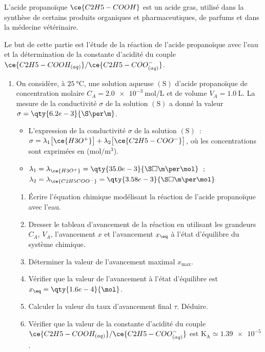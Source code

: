 L'acide propanoïque $\ce{C2H5-COOH}$ est un acide gras, utilisé dans la synthèse
de certains produits organiques et pharmaceutiques, de parfums et dans la
médecine vétérinaire.

Le but de cette partie est l'étude de la réaction de l'acide propanoïque avec
l'eau et la détermination de la constante d'acidité du couple
$\ce{C2H5-COOH_{(aq)}}/\ce{C2H5-COO^{-}_{(aq)}}$.

\begin{enumerate}
    \item On considère, à $\qty{25}{\degreeCelsius}$, une solution aqueuse
          $(\mathrm{S})$ d'acide propanoïque de concentration molaire
          $C_{A}=\qty{2.0e-3}{\mol\per\L}$ et de volume $V_{A}=\qty{1.0}{\L}$.
          La mesure de la conductivité $\sigma$ de la solution $(\mathrm{S})$ a
          donné la valeur $\sigma=\qty{6.2e-3}{\S\per\m}$.

          \begin{donnees}
              \begin{itemize}
                  \item L'expression de la conductivité $\sigma$ de la solution
                        $(\mathrm{S})$~:
                        $\sigma=\lambda_{1}\bigl[\ce{H3O^{+}}\bigr]+
                        \lambda_{2}\bigl[\ce{C2H5-COO^{-}}\bigr]$, où
                        les concentrations sont exprimées en
                        ($\unit{\mol\per\cubic\m}$).
                  \item $\lambda_{1}=\lambda_{\ce{H3O^{+}}}=
                        \qty{35.0e-3}{\S\square\m\per\mol}$~;
                        $\lambda_{2}=\lambda_{\ce{C2H5COO^-}}=
                        \qty{3.58e-3}{\S\square\m\per\mol}$
              \end{itemize}
          \end{donnees}
          \begin{enumerate}
              \item Écrire l'équation chimique modélisant la réaction de l'acide
                    propanoïque avec l'eau.
              \item Dresser le tableau d'avancement de la réaction en utilisant
                    les grandeurs $C_{A}$, $V_{A}$, l'avancement $x$ et
                    l'avancement $x_{\eq}$ à l'état d'équilibre du système
                    chimique.
              \item Déterminer la valeur de l'avancement maximal $x_{\max}$.
              \item Vérifier que la valeur de l'avancement à l'état d'équilibre
                    est $x_{\eq}=\qty{1.6e-4}{\mol}$.
              \item Calculer la valeur du taux d'avancement final $\tau$.
                    Déduire.
              \item Vérifier que la valeur de la constante d'acidité du couple
                    $\ce{C2H5-COOH_{(aq)}}/\ce{C2H5-COO^{-}_{(aq)}}$ est
                    $\mathrm{K_{A}}\simeq\num{1.39e-5}$.
          \end{enumerate}


\end{enumerate}
